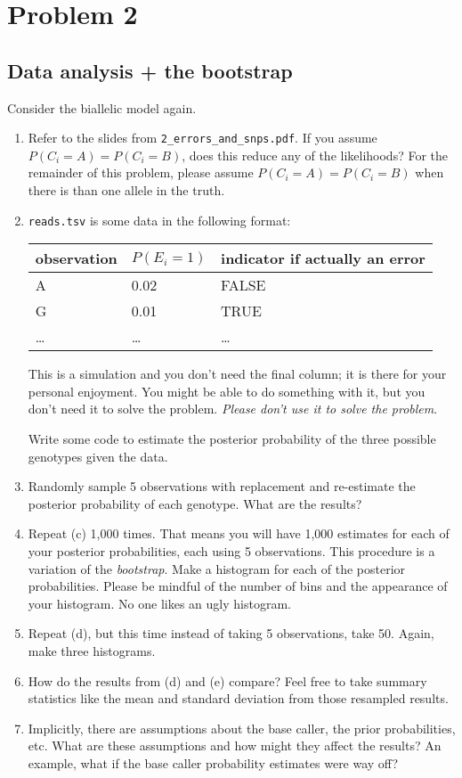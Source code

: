 \section*{Problem 2}
\subsection*{Data analysis + the bootstrap}

Consider the biallelic model again.

\begin{enumerate}[label=(\alph*)]
  \item Refer to the slides from \texttt{2\_errors\_and\_snps.pdf}. If you assume $P(C_i = A) = P(C_i = B)$, does this reduce any of the likelihoods?
    For the remainder of this problem, please assume $P(C_i = A) = P(C_i = B)$ when there is than one allele in the truth.
  \item \texttt{reads.tsv} is some data in the following format:

    \begin{center}
    \begin{tabular}{l|l|l}
      \textbf{observation} & \textbf{$P(E_i = 1)$} & \textbf{indicator if actually an error}\\
      \hline
      A & 0.02 & FALSE\\
      G & 0.01 & TRUE\\
      \ldots & \ldots & \ldots
    \end{tabular}
  \end{center}

  This is a simulation and you don't need the final column; it is there for your personal enjoyment.
  You might be able to do something with it, but you don't need it to solve the problem.
  \textit{Please don't use it to solve the problem}.

  Write some code to estimate the posterior probability of the three possible genotypes given the data.

  \item Randomly sample 5 observations with replacement and re-estimate the posterior probability of each genotype. What are the results?
  \item Repeat (c) 1,000 times.
    That means you will have 1,000 estimates for each of your posterior probabilities, each using 5 observations.
    This procedure is a variation of the \textit{bootstrap}.
    Make a histogram for each of the posterior probabilities.
    Please be mindful of the number of bins and the appearance of your histogram.
    No one likes an ugly histogram.
  \item Repeat (d), but this time instead of taking 5 observations, take 50.
    Again, make three histograms.
  \item How do the results from (d) and (e) compare?
    Feel free to take summary statistics like the mean and standard deviation from those resampled results.
  \item Implicitly, there are assumptions about the base caller, the prior probabilities, etc.
    What are these assumptions and how might they affect the results?
    An example, what if the base caller probability estimates were way off?
\end{enumerate}


